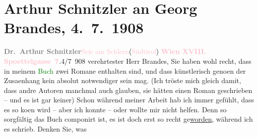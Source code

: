 

               \section[Arthur Schnitzler an Georg Brandes, 4. 7. 1908]{ Arthur Schnitzler an Georg Brandes, 4. 7. 1908}\nopagebreak{}\rehead{ }\normalsize\beginnumbering{} \toendnotes[C]{\smallbreak\pagebreak[2]} 
\toendnotes[C]{\smallbreak}\pstart
           \noindent{}{\pb}\textcolor{gray}{\textbf{Dr. Arthur Schnitzler}}\hfill \textcolor{pink}{Seis am Schlern}{}\ledrightnote{\textcolor{pink}{Seis am Schlern}}{ }\introOben{}(\textcolor{pink}{Südtirol}{}\ledrightnote{\textcolor{pink}{Südtirol}})\introOben{}\pend
           \pstart
           \textcolor{gray}{\textbf{\textcolor{pink}{Wien XVIII. Spoettelgasse 7}{}\ledrightnote{\textcolor{pink}{Edmund-Weiß-Gasse}}.}}\hfill 4/7 908\pend
           \pstart
           verehrtester Herr Brandes, Sie haben wohl recht, dass in meinem
                        \textcolor{green}{Buch}{} zwei Romane
                    enthalten sind, und dass künstlerisch geno{\geminationm}en der
                        Zusa{\geminationm}enhang kein absolut notwendiger sein mag.
                    (Ich tröste mich gleich damit, dass andre Autoren manchmal auch glauben, sie
                    hätten einen Roman geschrieben – und es ist gar keiner) Schon während meiner
                    Arbeit hab ich immer gefühlt, dass es so ko{\geminationm}en wird
                    – aber ich konnte – oder wollte mir nicht helfen. Denn so sorgfältig das Buch
                    componirt ist, es ist doch erst so recht ge{\pb}\uline{worden}, während ich es schrieb. Denken Sie, was
